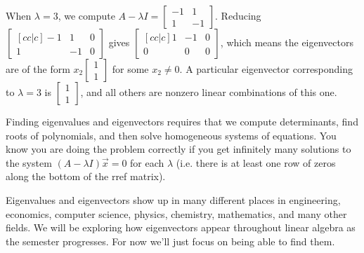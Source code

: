 \begin{example}
When {$\lambda=3$}, we compute {$A-\lambda I =\begin{bmatrix} -1&1\\1&-1\end{bmatrix} $}. Reducing  
$\begin{bmatrix}[cc|c] -1&1&0\\1&-1&0\end{bmatrix}$ gives
$\begin{bmatrix}[cc|c] 1&-1&0\\0&0&0\end{bmatrix}$, which means the eigenvectors are of the form $x_2\begin{bmatrix} 1\\1\end{bmatrix} $ for some {$x_2\neq 0$}. A particular eigenvector corresponding to $\lambda=3$ is $\begin{bmatrix} 1\\1\end{bmatrix} $, and all others are nonzero linear combinations of this one.
\end{example}

Finding eigenvalues and eigenvectors requires that we compute determinants, find roots of polynomials, and then solve homogeneous systems of equations. You know you are doing the problem correctly if you get infinitely many solutions to the system $(A-\lambda I)\vec x=0$ for each $\lambda$ (i.e. there is at least one row of zeros along the bottom of the rref matrix).

Eigenvalues and eigenvectors show up in many different places in engineering, economics, computer science, physics, chemistry, mathematics, and many other fields. We will be exploring how eigenvectors appear throughout linear algebra 
as the semester progresses.  For now we'll just focus on being able to find them.

